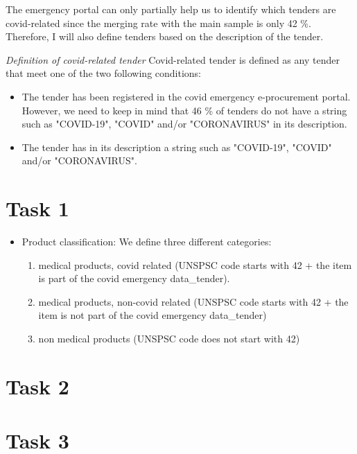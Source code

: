 \documentclass[
]{article}
\begin{document}
The emergency portal can only partially help us to identify which
tenders are covid-related since the merging rate with the main sample is
only 42 \%. Therefore, I will also define tenders based on the
description of the tender.

\emph{Definition of covid-related tender} Covid-related tender is
defined as any tender that meet one of the two following conditions:

\begin{itemize}
  \item The tender has been registered in the covid emergency e-procurement portal. However, we need to keep in mind that 46 \% of tenders do not have a string such as "COVID-19", "COVID" and/or "CORONAVIRUS" in its description.  
  \item The tender has in its description a string such as "COVID-19", "COVID" and/or "CORONAVIRUS".  
\end{itemize}

\hypertarget{task-1}{%
\section{Task 1}\label{task-1}}

\begin{itemize}
  \item Product classification: We define three different categories: 
  \begin{enumerate}
    \item medical products, covid related (UNSPSC code starts with 42 + the item is part of the covid emergency data\_tender).
    \item medical products, non-covid related (UNSPSC code starts with 42 + the item is not part of the covid emergency data\_tender)
    \item non medical products (UNSPSC code does not start with 42)
  \end{enumerate}
\end{itemize}

\hypertarget{task-2}{%
\section{Task 2}\label{task-2}}

\hypertarget{task-3}{%
\section{Task 3}\label{task-3}}
\end{document}
